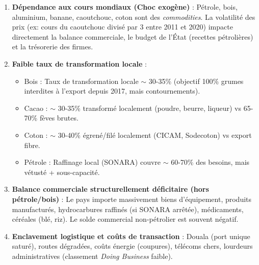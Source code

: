 \documentclass[11pt]{article}
\begin{document}
\begin{enumerate}
    \item \textbf{Dépendance aux cours mondiaux (Choc exogène)} : Pétrole, bois, aluminium, banane, caoutchouc, coton sont des \emph{commodities}. La volatilité des prix (ex: cours du caoutchouc divisé par 3 entre 2011 et 2020) impacte directement la balance commerciale, le budget de l'État (recettes pétrolières) et la trésorerie des firmes.
    \item \textbf{Faible taux de transformation locale} :
    \begin{itemize}
        \item Bois : Taux de transformation locale $\sim$ 30-35\% (objectif 100\% grumes interdites à l'export depuis 2017, mais contournements).
        \item Cacao : $\sim$ 30-35\% transformé localement (poudre, beurre, liqueur) vs 65-70\% fèves brutes.
        \item Coton : $\sim$ 30-40\% égrené/filé localement (CICAM, Sodecoton) vs export fibre.
        \item Pétrole : Raffinage local (SONARA) couvre $\sim$ 60-70\% des besoins, mais vétusté + sous-capacité.
    \end{itemize}
    \item \textbf{Balance commerciale structurellement déficitaire (hors pétrole/bois)} : Le pays importe massivement biens d'équipement, produits manufacturés, hydrocarbures raffinés (si SONARA arrêtée), médicaments, céréales (blé, riz). Le solde commercial non-pétrolier est souvent négatif.
    \item \textbf{Enclavement logistique et coûts de transaction} : Douala (port unique saturé), routes dégradées, coûts énergie (coupures), télécoms chers, lourdeurs administratives (classement \emph{Doing Business} faible).
\end{enumerate}
\end{document}
